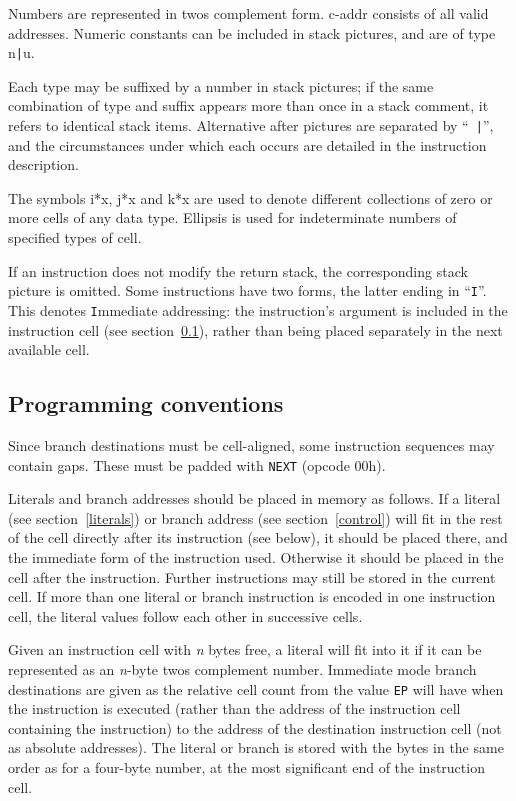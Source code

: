 \documentclass[english]{article}
\newcommand{\spic}[1]{{\spfont\setlength{\baselineskip}{\normalbaselineskip}#1\/}}
\newlength{\opcode}\opcode=0.5in
\begin{document}
Numbers are represented in twos complement form. \spic{c-addr} consists of all
valid addresses. Numeric constants can be included in
stack pictures, and are of type \spic{n{\tt |}u}.

Each type may be suffixed by a number in stack pictures; if the same combination
of type and suffix appears more than once in a stack comment, it refers to
identical stack items. Alternative \spic{after} pictures are separated by ``{\tt
|}'', and the circumstances under which each occurs are detailed in the
instruction description.

The symbols \spic{i*x}, \spic{j*x} and \spic{k*x} are used to denote different
collections of zero or more cells of any data type. Ellipsis is used for
indeterminate numbers of specified types of cell.

If an instruction does not modify the return stack, the corresponding stack
picture is omitted. Some instructions have two forms, the latter ending in
``{\tt I}''. This denotes {\tt I}mmediate addressing: the instruction's argument
is included in the instruction cell (see section~\ref{conventions}), rather than
being placed separately in the next available cell.


\subsection{Programming conventions}
\label{conventions}

Since branch destinations must be cell-aligned, some instruction sequences may
contain gaps. These must be padded with {\tt NEXT} (opcode 00h).

Literals and branch addresses should be placed in memory as follows. If a
literal (see section~\ref{literals}) or branch address (see section~\ref{control})
will fit in the rest of the cell directly after its instruction
(see below), it should be placed there, and the immediate form of the
instruction used. Otherwise it should be placed in the cell after the
instruction. Further instructions may still be stored in the current cell. If
more than one literal or branch instruction is encoded in one instruction cell,
the literal values follow each other in successive cells.

Given an instruction cell with \textit{n} bytes free, a literal will fit into
it if it can be represented as an \textit{n}-byte twos complement number.
Immediate mode branch destinations are given as the relative cell count from
the value {\tt EP} will have when the instruction is executed (rather than the
address of the instruction cell containing the instruction) to the address of
the destination instruction cell (not as absolute addresses). The literal or
branch is stored with the bytes in the same order as for a four-byte number, at
the most significant end of the instruction cell.
\end{document}
